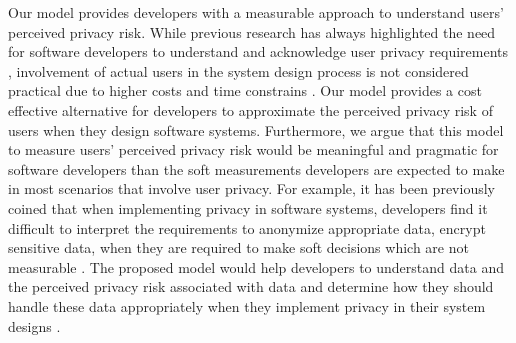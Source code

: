 \documentclass[10pt]{article}
\begin{document}
Our model provides developers with a measurable approach to understand users' perceived privacy risk. While previous research has always highlighted the need for software developers to understand and acknowledge user privacy requirements \cite {senarath2018under, ayalon2018crowdsourcing}, involvement of actual users in the system design process is not considered practical due to higher costs and time constrains \cite {senarath2017designing}. Our model provides a cost effective alternative for developers to approximate the perceived privacy risk of users when they design software systems. Furthermore, we argue that this model to measure users' perceived privacy risk would be meaningful and pragmatic for software developers than the soft measurements developers are expected to make in most scenarios that involve user privacy. For example, it has been previously coined that when implementing privacy in software systems, developers find it difficult to interpret the requirements to anonymize appropriate data, encrypt sensitive data, when they are required to make soft decisions which are not measurable \cite {senarath2018why}. The proposed model would help developers to understand data and the perceived privacy risk associated with data and determine how they should handle these data appropriately when they implement privacy in their system designs \cite {marr2015big}.
\end{document}
